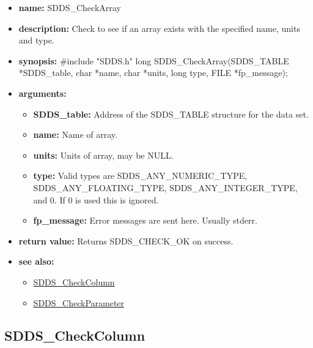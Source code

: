 \documentclass[11pt]{article}
\newcommand{\progref}[1]{\hyperref{SDDS_#1}{{\tt SDDS\_#1} (}{)}{SDDS_#1}}
\begin{document}
\begin{itemize}
\item {\bf name:}\newline
SDDS\_CheckArray
\item {\bf description:}\newline
Check to see if an array exists with the specified name, units and type.
\item {\bf synopsis:} \#include "SDDS.h"\newline
long SDDS\_CheckArray(SDDS\_TABLE *SDDS\_table, char *name, char *units, long type, FILE *fp\_message);
\item {\bf arguments:}
\begin{itemize}
\item {\bf SDDS\_table:} Address of the SDDS\_TABLE structure for the data set.
\item {\bf name:} Name of array.
\item {\bf units:} Units of array, may be NULL.
\item {\bf type:} Valid types are SDDS\_ANY\_NUMERIC\_TYPE, SDDS\_ANY\_FLOATING\_TYPE, SDDS\_ANY\_INTEGER\_TYPE, and 0. If 0 is used this is ignored.
\item {\bf fp\_message:} Error messages are sent here. Usually stderr.
\end{itemize}
\item {\bf return value:}\newline
Returns SDDS\_CHECK\_OK on success.
\item {\bf see also:}
\begin{itemize}
\item \progref{CheckColumn}
\item \progref{CheckParameter}
\end{itemize}
\end{itemize}

\subsection{SDDS\_CheckColumn}
\label{SDDS_CheckColumn}
\end{document}
